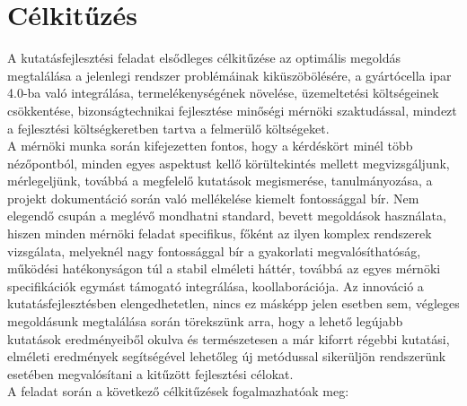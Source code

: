 \documentclass{article}
\begin{document}
\section{Célkitűzés}
A kutatásfejlesztési feladat elsődleges célkitűzése az optimális megoldás megtalálása a jelenlegi rendszer problémáinak kiküszöbölésére, a gyártócella ipar 4.0-ba való integrálása, termelékenységének növelése, üzemeltetési költségeinek csökkentése, bizonságtechnikai fejlesztése minőségi mérnöki szaktudással, mindezt a fejlesztési költségkeretben tartva a felmerülő költségeket.\vspace{5pt}\\
A mérnöki munka során kifejezetten fontos, hogy a kérdéskört minél több nézőpontból, minden egyes aspektust kellő körültekintés mellett megvizsgáljunk, mérlegeljünk, továbbá a megfelelő kutatások megismerése, tanulmányozása, a projekt dokumentáció során való mellékelése kiemelt fontossággal bír. Nem elegendő csupán a meglévő mondhatni standard, bevett megoldások használata, hiszen minden mérnöki feladat specifikus, főként
az ilyen komplex rendszerek vizsgálata, melyeknél nagy fontossággal bír a gyakorlati megvalósíthatóság, működési hatékonyságon túl a stabil elméleti háttér, továbbá az egyes mérnöki specifikációk egymást támogató integrálása, koollaborációja. Az innováció a kutatásfejlesztésben elengedhetetlen, nincs ez másképp jelen esetben sem, végleges megoldásunk megtalálása során törekszünk arra, hogy a lehető legújabb kutatások eredményeiből okulva
 és természetesen a már kiforrt régebbi kutatási, elméleti eredmények segítségével lehetőleg új metódussal sikerüljön rendszerünk esetében megvalósítani a kitűzött fejlesztési célokat.\vspace{5pt}\\
A feladat során a következő célkitűzések fogalmazhatóak meg:
\end{document}
